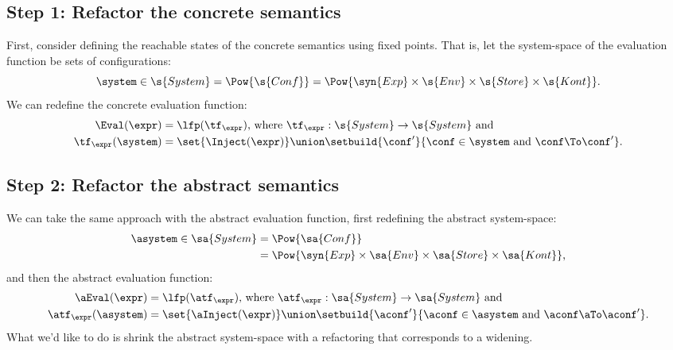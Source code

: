 \subsection{Step 1: Refactor the concrete semantics}
First, consider defining the reachable states of the concrete
semantics using fixed points.
That is, let the system-space of the evaluation function be
sets of configurations:
\begin{equation*}
  \system \in \s{System} = 
  \Pow{\s{Conf}} =
  \Pow{\syn{Exp} \times \s{Env} \times \s{Store} \times \s{Kont}}
  \text.
\end{equation*}
We can redefine the concrete evaluation function:
\begin{align*}
  \Eval(\expr) &= \lfp(\tf_\expr)\text{, where }
  \tf_\expr: \s{System} \to \s{System}
  \text{ and }
  \\
  \tf_\expr(\system) &= \set{\Inject(\expr)} \union \setbuild{ \conf' }{ \conf \in \system \text{ and } \conf \To \conf' }
  \text.
\end{align*}

\subsection{Step 2: Refactor the abstract semantics}
We can take the same approach with the abstract evaluation function,
first redefining the abstract system-space:
\begin{align*}
  \asystem  \in \sa{System} &= 
  \Pow{\sa{Conf}} 
\\
&=
  \Pow{\syn{Exp} \times \sa{Env} \times \sa{Store} \times \sa{Kont}}
  \text,
\end{align*}
and then the abstract evaluation function:
\begin{align*}
  \aEval(\expr) &= \lfp(\atf_\expr)\text{, where } \atf_\expr : \sa{System} \to \sa{System} \text{ and }
  \\
  \atf_\expr(\asystem) &= \set{\aInject(\expr)} \union \setbuild{ \aconf' }
  { \aconf \in \asystem \text{ and } \aconf \aTo \aconf' }
  \text.
\end{align*}
What we'd like to do is shrink the abstract system-space with a
refactoring that corresponds to a widening.

